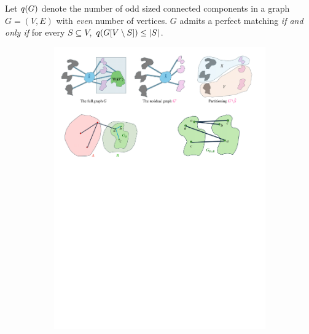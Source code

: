 \documentclass[11pt]{article}
\begin{document}
\begin{lemma}\label{lemma:tutte-criterion}
Let $q(G)$ denote the number of odd sized connected components in a graph $G=(V,E)$ with \emph{even} number of vertices.
$G$ admits a perfect matching \emph{if and only if} for every $S \subseteq V$, $q(G[V \setminus S]) \leq |S|$.
\end{lemma}
\begin{figure}
    \centering
    \begin{subfigure}[t]{0.3\textwidth}
        \centering
        \includegraphics[width=\textwidth]{assets/part-a.pdf}
        \caption{}
        \label{fig:before-deletions}
    \end{subfigure}
    \hfill
    \begin{subfigure}[t]{0.3\textwidth}
        \centering

\end{subfigure}
\end{figure}
\end{document}

